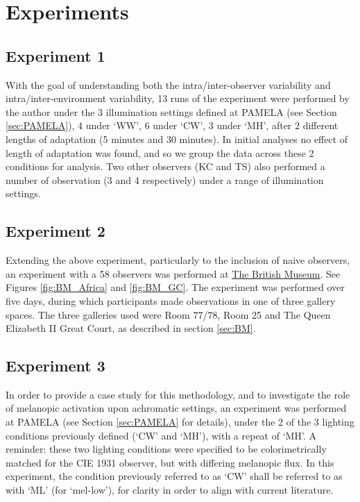 \clearpage

\section{Experiments}

\subsection{Experiment 1}
With the goal of understanding both the intra/inter-observer variability and intra/inter-environment variability, 13 runs of the experiment were performed by the author under the 3 illumination settings defined at \gls{PAMELA} (see Section \ref{sec:PAMELA}), 4 under `WW', 6 under `CW', 3 under `MH', after 2 different lengths of adaptation (5 minutes and 30 minutes). In initial analyses no effect of length of adaptation was found, and so we group the data across these 2 conditions for analysis. Two other observers (KC and TS) also performed a number of observation (3 and 4 respectively) under a range of illumination settings.

\subsection{Experiment 2}

Extending the above experiment, particularly to the inclusion of naive observers, an experiment with a 58 observers was performed at \hyperref[sec:BM]{The British Museum}. See Figures \ref{fig:BM_Africa} and \ref{fig:BM_GC}.
The experiment was performed over five days, during which participants made observations in one of three gallery spaces. The three galleries used were Room 77/78, Room 25 and The Queen Elizabeth II Great Court, as described in section \ref{sec:BM}. 

\subsection{Experiment 3}
In order to provide a case study for this methodology, and to investigate the role of melanopic activation upon achromatic settings, an experiment was performed at \gls{PAMELA} (see Section \ref{sec:PAMELA} for details), under the 2 of the 3 lighting conditions previously defined (`CW' and `MH'), with a repeat of `MH'. A reminder: these two lighting conditions were specified to be colorimetrically matched for the CIE 1931 observer, but with differing melanopic flux. In this experiment, the condition previously referred to as `CW' shall be referred to as with `ML' (for `mel-low'), for clarity in order to align with current literature.

